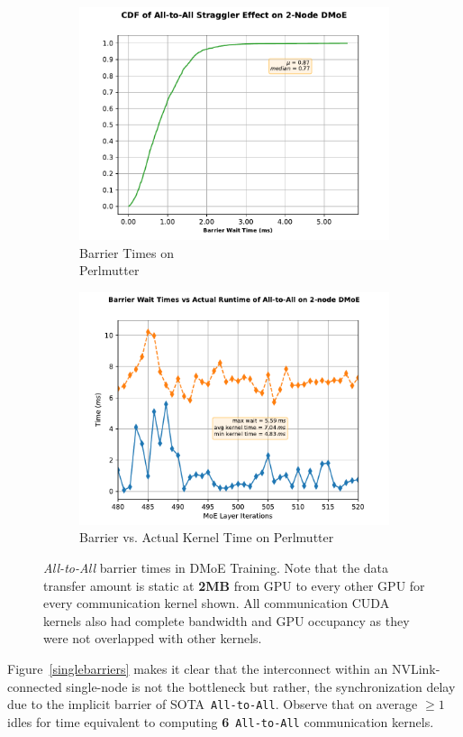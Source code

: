 \begin{figure}[!h]
    \medskip %
    \begin{subfigure}{\linewidth}
        \centering
        \includegraphics[width=0.8\linewidth]{images/barrier_m}
        \caption{Barrier Times on \\ Perlmutter}
        \label{multibecdf}
    \end{subfigure}\hfill %
    \begin{subfigure}{.5\linewidth}
        \centering
        \includegraphics[width=0.8\linewidth, keepaspectratio]{images/m_distribution}
        \caption{Barrier vs. Actual Kernel Time on Perlmutter}
        \label{multibarriers}
    \end{subfigure}

    \caption{\small\emph{All-to-All} barrier times in DMoE Training.
    Note that the data transfer amount is static at \textbf{2MB} from GPU to
    every other GPU for every communication kernel shown. All communication CUDA kernels
    also had complete bandwidth and GPU occupancy as they were not overlapped with other kernels.}
    \label{fig:perfvar}
\end{figure}
Figure~\ref{singlebarriers} makes it clear that the interconnect within an NVLink-connected single-node
is not the bottleneck but rather, the synchronization delay due to the implicit barrier of SOTA~\verb|All-to-All|.
Observe that on average $\geq 1$ idles for time equivalent to computing \textbf{6}~\verb|All-to-All|
communication kernels.
